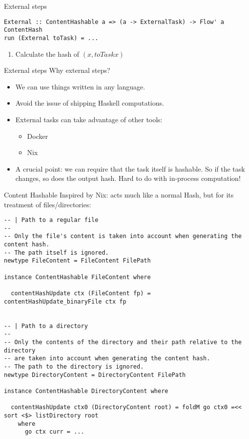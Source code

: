 \documentclass[11pt]{beamer}
\begin{document}
\begin{frame}[fragile]{External steps}
\begin{lstlisting}[basicstyle=\tiny, frame=single]
External :: ContentHashable a => (a -> ExternalTask) -> Flow' a ContentHash
run (External toTask) = ...
\end{lstlisting}
\begin{enumerate}
\item Calculate the hash of $(x, toTask x)$
\end{enumerate}
\end{frame}
\begin{frame}{External steps}
Why external steps?
\begin{itemize}
\item We can use things written in any language.
\item Avoid the issue of shipping Haskell computations.
\item External tasks can take advantage of other tools:
\begin{itemize}
\item Docker
\item Nix
\end{itemize}
\item A crucial point: we can require that the task itself is hashable. So if the task changes, so does the output hash. Hard to do with in-process computation!
\end{itemize}
\end{frame}

\begin{frame}[fragile]{Content Hashable}
Inspired by Nix: acts much like a normal Hash, but for its treatment of files/directories:
\begin{lstlisting}[basicstyle=\tiny]
-- | Path to a regular file
--
-- Only the file's content is taken into account when generating the content hash.
-- The path itself is ignored.
newtype FileContent = FileContent FilePath

instance ContentHashable FileContent where

  contentHashUpdate ctx (FileContent fp) = contentHashUpdate_binaryFile ctx fp


-- | Path to a directory
--
-- Only the contents of the directory and their path relative to the directory
-- are taken into account when generating the content hash.
-- The path to the directory is ignored.
newtype DirectoryContent = DirectoryContent FilePath

instance ContentHashable DirectoryContent where

  contentHashUpdate ctx0 (DirectoryContent root) = foldM go ctx0 =<< sort <$> listDirectory root
    where
      go ctx curr = ...
\end{lstlisting}
\end{frame}
\end{document}
